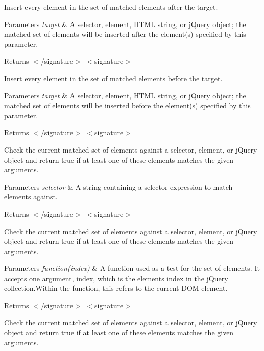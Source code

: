 Insert every element in the set of matched elements after the target.


\begin{DoxyParams}{Parameters}
{\em target} & A selector, element, H\+T\+M\+L string, or j\+Query object; the matched set of elements will be inserted after the element(s) specified by this parameter.\\
\hline
\end{DoxyParams}
\begin{DoxyReturn}{Returns}
$<$/signature$>$ $<$signature$>$ 

Insert every element in the set of matched elements before the target.
\end{DoxyReturn}

\begin{DoxyParams}{Parameters}
{\em target} & A selector, element, H\+T\+M\+L string, or j\+Query object; the matched set of elements will be inserted before the element(s) specified by this parameter.\\
\hline
\end{DoxyParams}
\begin{DoxyReturn}{Returns}
$<$/signature$>$ $<$signature$>$ 

Check the current matched set of elements against a selector, element, or j\+Query object and return true if at least one of these elements matches the given arguments.
\end{DoxyReturn}

\begin{DoxyParams}{Parameters}
{\em selector} & A string containing a selector expression to match elements against.\\
\hline
\end{DoxyParams}
\begin{DoxyReturn}{Returns}
$<$/signature$>$ $<$signature$>$ 

Check the current matched set of elements against a selector, element, or j\+Query object and return true if at least one of these elements matches the given arguments.
\end{DoxyReturn}

\begin{DoxyParams}{Parameters}
{\em function(index)} & A function used as a test for the set of elements. It accepts one argument, index, which is the element\textquotesingle{}s index in the j\+Query collection.\+Within the function, this refers to the current D\+O\+M element.\\
\hline
\end{DoxyParams}
\begin{DoxyReturn}{Returns}
$<$/signature$>$ $<$signature$>$ 

Check the current matched set of elements against a selector, element, or j\+Query object and return true if at least one of these elements matches the given arguments.
\end{DoxyReturn}

